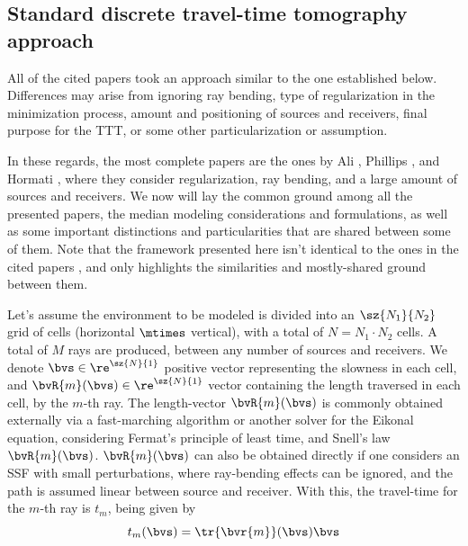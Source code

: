 \subsection{Standard discrete travel-time tomography approach}
\label{subsec:sec2:standard_ttt_approach}

All of the cited papers took an approach similar to the one established below. Differences may arise from ignoring ray bending, type of regularization in the minimization process, amount and positioning of sources and receivers, final purpose for the TTT, or some other particularization or assumption.

In these regards, the most complete papers are the ones by Ali \cite{ali_opensource_2019}, Phillips \cite{phillips_traveltime_1991}, and Hormati \cite{hormati_robust_2010}, where they consider regularization, ray bending, and a large amount of sources and receivers. We now will lay the common ground among all the presented papers, the median modeling considerations and formulations, as well as some important distinctions and particularities that are shared between some of them. Note that the framework presented here isn't identical to the ones in the cited papers \cite{aki_determination_1977,aki_determination_1976,ali_opensource_2019,hormati_robust_2010,jeong_investigating_2024,hellmann_borehole_2023,phillips_traveltime_1991,zhang_nonlinear_1998,dines_computerized_1979}, and only highlights the similarities and mostly-shared ground between them.

Let's assume the environment to be modeled is divided into an $\sz{N_1}{N_2}$ grid of cells (horizontal $\mtimes$ vertical), with a total of $N = N_1\cdot N_2$ cells. A total of $M$ rays are produced, between any number of sources and receivers. We denote $\bvs \in \re^{\sz{N}{1}}$ positive vector representing the slowness in each cell, and $\bvR{m}(\bvs) \in \re^{\sz{N}{1}}$ vector containing the length traversed in each cell, by the $m$-th ray. The length-vector $\bvR{m}(\bvs)$ is commonly obtained externally via a fast-marching algorithm or another solver for the Eikonal equation, considering Fermat's principle of least time, and Snell's law $\bvR{m}(\bvs)$. $\bvR{m}(\bvs)$ can also be obtained directly if one considers an SSF with small perturbations, where ray-bending effects can be ignored, and the path is assumed linear between source and receiver. With this, the travel-time for the $m$-th ray is $t_m$, being given by
\begin{equation}
	t_m(\bvs) = \tr{\bvr{m}}(\bvs) \bvs
\end{equation}


